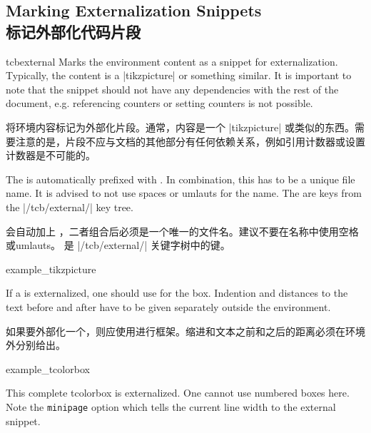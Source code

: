 

\subsection{Marking Externalization Snippets\\标记外部化代码片段}\label{subsec:external_marking}

\begin{docEnvironment}[doc new=2015-03-11]{tcbexternal}{}
Marks the environment content as a snippet for externalization.
Typically, the content is a |tikzpicture| or something similar.
It is important to note that the snippet should not have any dependencies
with the rest of the document, e.g. referencing counters or setting counters
is not possible.

将环境内容标记为外部化片段。通常，内容是一个 |tikzpicture| 或类似的东西。需要注意的是，片段不应与文档的其他部分有任何依赖关系，例如引用计数器或设置计数器是不可能的。

The  is automatically prefixed with .
In combination, this has to be a unique file name. It is advised to not
use spaces or umlauts for the name.
The  are keys from the |/tcb/external/| key tree.

会自动加上 ，二者组合后必须是一个唯一的文件名。建议不要在名称中使用空格或umlauts。  是 |/tcb/external/| 关键字树中的键。
\begin{dispExample}
\begin{tcbexternal}{example_tikzpicture}
\end{tcbexternal}
\end{dispExample}



If a  is externalized, one should use
 for the box. Indention and distances to
the text before and after have to be given separately outside the
 environment.

如果要外部化一个，则应使用进行框架。缩进和文本之前和之后的距离必须在环境外分别给出。
\begin{dispExample}
\noindent%
\begin{tcbexternal}[minipage]{example_tcolorbox}
  \begin{tcolorbox}[nobeforeafter,enhanced,
      fonttitle=\bfseries,title=Externalized Box,
      colframe=red!50!black,drop fuzzy shadow,
      interior style={fill overzoom image=goldshade.png}]
This complete tcolorbox is externalized. One cannot use numbered
boxes here. Note the \texttt{minipage} option which tells the
current line width to the external snippet.


\end{tcolorbox}
\end{tcbexternal}
\end{dispExample}
\end{docEnvironment}
